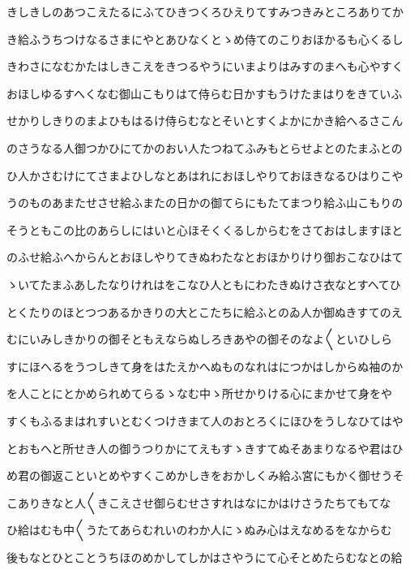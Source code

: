 \documentclass[a4paper,11pt,landscape]{ltjtarticle}
\begin{document}
\par\medskip
きしきしのあつこえたるにふてひきつくろひえりてすみつきみところありてか
\par\medskip
き給ふうちつけなるさまにやとあひなくとゝめ侍てのこりおほかるも心くるし
\par\medskip
きわさになむかたはしきこえをきつるやうにいまよりはみすのまへも心やすく
\par\medskip
おほしゆるすへくなむ御山こもりはて侍らむ日かすもうけたまはりをきていふ
\par\medskip
せかりしきりのまよひもはるけ侍らむなとそいとすくよかにかき給へるさこん
\par\medskip
のさうなる人御つかひにてかのおい人たつねてふみもとらせよとのたまふとの
\par\medskip
ひ人かさむけにてさまよひしなとあはれにおほしやりておほきなるひはりこや
\par\medskip
うのものあまたせさせ給ふまたの日かの御てらにもたてまつり給ふ山こもりの
\par\medskip
そうともこの比のあらしにはいと心ほそくくるしからむをさておはしますほと
\par\medskip
のふせ給ふへからんとおほしやりてきぬわたなとおほかりけり御おこなひはて
\par\medskip
ゝいてたまふあしたなりけれはをこなひ人ともにわたきぬけさ衣なとすへてひ
\par\medskip
とくたりのほとつつあるかきりの大とこたちに給ふとのゐ人か御ぬきすてのえ
\par\medskip
むにいみしきかりの御そともえならぬしろきあやの御そのなよ〱といひしら
\par\medskip
すにほへるをうつしきて身をはたえかへぬものなれはにつかはしからぬ袖のか
\par\medskip
を人ことにとかめられめてらるゝなむ中ゝ所せかりける心にまかせて身をや
\par\medskip
すくもふるまはれすいとむくつけきまて人のおとろくにほひをうしなひてはや
\par\medskip
とおもへと所せき人の御うつりかにてえもすゝきすてぬそあまりなるや君はひ
\par\medskip
め君の御返こといとめやすくこめかしきをおかしくみ給ふ宮にもかく御せうそ
\par\medskip
こありきなと人〱きこえさせ御らむせさすれはなにかはけさうたちてもてな
\par\medskip
ひ給はむも中〱うたてあらむれいのわか人にゝぬみ心はえなめるをなからむ
\par\medskip
後もなとひとことうちほのめかしてしかはさやうにて心そとめたらむなとの給
\par\medskip
\end{document}
